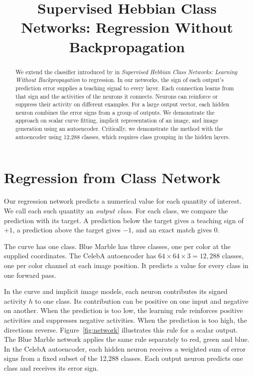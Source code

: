 \documentclass[10pt]{article}
\title{Supervised Hebbian Class Networks: Regression Without Backpropagation}
\author{}
\begin{document}
\maketitle

\begin{abstract}
We extend the classifier introduced by \citet{loverich2026} in \emph{Supervised Hebbian Class Networks: Learning Without Backpropagation} to regression. In our networks, the sign of each output's prediction error supplies a teaching signal to every layer. Each connection learns from that sign and the activities of the neurons it connects. Neurons can reinforce or suppress their activity on different examples. For a large output vector, each hidden neuron combines the error signs from a group of outputs. We demonstrate the approach on scalar curve fitting, implicit representation of an image, and image generation using an autoencoder. Critically, we demonstrate the method with the autoencoder using 12,288 classes, which requires class grouping in the hidden layers.
\end{abstract}

\section{Regression from Class Network}
Our regression network predicts a numerical value for each quantity of interest. We call each such quantity an \emph{output class}. For each class, we compare the prediction with its target. A prediction below the target gives a teaching sign of $+1$, a prediction above the target gives $-1$, and an exact match gives $0$.

The curve has one class. Blue Marble has three classes, one per color at the supplied coordinates. The CelebA autoencoder has $64\times64\times3=12{,}288$ classes, one per color channel at each image position. It predicts a value for every class in one forward pass.

In the curve and implicit image models, each neuron contributes its signed activity $h$ to one class. Its contribution can be positive on one input and negative on another. When the prediction is too low, the learning rule reinforces positive activities and suppresses negative activities. When the prediction is too high, the directions reverse. Figure~\ref{fig:network} illustrates this rule for a scalar output. The Blue Marble network applies the same rule separately to red, green and blue. In the CelebA autoencoder, each hidden neuron receives a weighted sum of error signs from a fixed subset of the 12,288 classes. Each output neuron predicts one class and receives its error sign.
\end{document}
